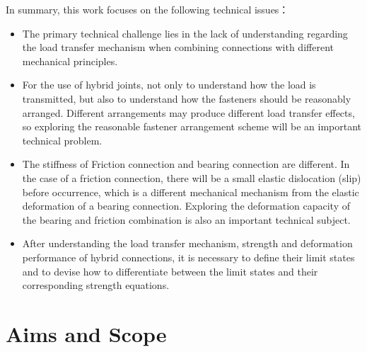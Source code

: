 In summary, this work focuses on the following technical issues：

\begin{itemize}
    \item The primary technical challenge lies in the lack of understanding regarding the load transfer mechanism when combining connections with different mechanical principles.
    \item For the use of hybrid joints, not only to understand how the load is transmitted, but also to understand how the fasteners should be reasonably arranged. Different arrangements may produce different load transfer effects, so exploring the reasonable fastener arrangement scheme will be an important technical problem.
    \item The stiffness of Friction connection and bearing connection are different. In the case of a friction connection, there will be a small elastic dislocation (slip) before occurrence, which is a different mechanical mechanism from the elastic deformation of a bearing connection. Exploring the deformation capacity of the bearing and friction combination is also an important technical subject.
    \item After understanding the load transfer mechanism, strength and deformation performance of hybrid connections, it is necessary to define their limit states and to devise how to differentiate between the limit states and their corresponding strength equations.
    
\end{itemize}



\section{Aims and Scope}

